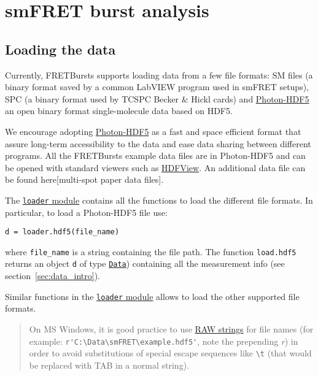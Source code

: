 \section{smFRET burst analysis}

\subsection{Loading the data}
Currently, FRETBursts supports loading data from a few file formats: SM files
(a binary format saved by a common LabVIEW program used in smFRET setups), 
SPC (a binary format used by TCSPC Becker \& Hickl cards) and 
\href{http://photon-hdf5.readthedocs.org/}{Photon-HDF5}  an open binary 
format single-molecule data based on HDF5.

We encourage adopting \href{http://photon-hdf5.readthedocs.org/}{Photon-HDF5}
as a fast and space efficient format that assure long-term accessibility 
to the data and ease data sharing between different programs. All the 
FRETBursts example data files are in Photon-HDF5 and can be opened with 
standard viewers such as 
\href{http://www.hdfgroup.org/products/java/hdfview/}{HDFView}. An additional data file 
can be found here[multi-spot paper data files].

The \href{http://fretbursts.readthedocs.org/en/latest/loader.html}{\texttt{loader} module}
contains all the functions to load the different file formats. 
In particular, to load a Photon-HDF5 file use:

\begin{verbatim}
d = loader.hdf5(file_name)
\end{verbatim}

where \verb|file_name| is a string containing the file path. The function
\verb|load.hdf5| returns an object \verb|d| of type 
\href{http://fretbursts.readthedocs.org/en/latest/data_class.html}{\texttt{Data}}) 
containing all the measurement info (see section~\ref{sec:data_intro}).

Similar functions in the 
\href{http://fretbursts.readthedocs.org/en/latest/loader.html}{\texttt{loader} module} 
allows to load the other supported file formats.

\begin{quote}
On MS Windows, it is good practice to use 
\href{https://docs.python.org/2/tutorial/introduction.html#strings}{RAW strings} 
for file names (for example: \verb|r'C:\Data\smFRET\example.hdf5'|, note the 
prepending \textit{r}) in order to avoid substitutions of special escape 
sequences like \verb|\t| (that would be replaced with TAB in a normal string).
\end{quote}

